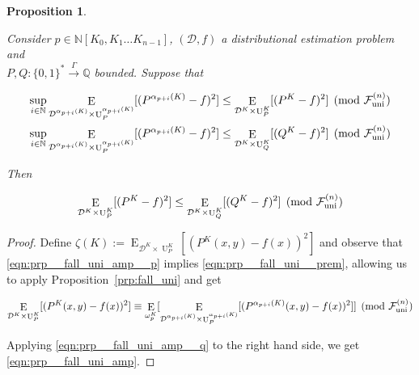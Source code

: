 \documentclass[11pt]{article}
\numberwithin{equation}{section}
\theoremstyle{definition}
\theoremstyle{plain}
\newtheorem{proposition}{Proposition}[section]
\newcommand{\Bool}{\{0,1\}}
\newcommand{\Words}{{\Bool^*}}
\DeclareMathOperator{\E}{E}
\DeclareMathOperator{\Un}{U}
\newcommand{\Nats}{\mathbb{N}}
\newcommand{\Rats}{\mathbb{Q}}
\newcommand{\NatPoly}{\Nats[K_0, K_1 \ldots K_{n-1}]}
\newcommand{\Dist}{\mathcal{D}}
\newcommand{\Fall}{\mathcal{F}}
\newcommand{\FallU}{{\Fall_{\textnormal{uni}}^{(n)}}}
\newcommand{\Scheme}{\xrightarrow{\Gamma}}
\begin{document}
\begin{samepage}
\begin{proposition}
\label{prp:fall_uni_amp}

Consider ${p \in \NatPoly}$, ${(\Dist,f)}$ a distributional estimation problem and\\ ${P,Q: \Words \Scheme \Rats}$ bounded. Suppose that

\begin{align}
\label{eqn:prp__fall_uni_amp__p}\sup_{i \in \Nats} \E_{ \Dist^{\alpha_{p+i}(K)} \times \Un_P^{\alpha_{p+i}(K)}}[(P^{\alpha_{p+i}(K)}-f)^2] &\leq \E_{ \Dist^{K} \times \Un_P^{K}}[(P^{K}-f)^2] \pmod\FallU \\
\label{eqn:prp__fall_uni_amp__q}\sup_{i \in \Nats} \E_{\Dist^{\alpha_{p+i}(K)} \times \Un_P^{\alpha_{p+i}(K)}}[(P^{\alpha_{p+i}(K)}-f)^2] &\leq \E_{\Dist^{K} \times \Un_Q^{K}}[(Q^{K}-f)^2] \pmod\FallU
\end{align}

Then

\begin{equation}
\label{eqn:prp__fall_uni_amp}
\E_{\Dist^{K} \times \Un_P^{K}}[(P^{K}-f)^2] \leq \E_{\Dist^{K} \times \Un_Q^{K}}[(Q^{K}-f)^2] \pmod \FallU
\end{equation}

\end{proposition}
\end{samepage}

\begin{proof}

Define ${\zeta(K):=\E_{\Dist^{K} \times \Un_P^{K}}[(P^{K}(x,y)-f(x))^2]}$ and observe that \ref{eqn:prp__fall_uni_amp__p} implies \ref{eqn:prp__fall_uni__prem}, allowing us to apply Proposition~\ref{prp:fall_uni} and get

\[\E_{\Dist^{K} \times \Un_P^{K}}[(P^{K}(x,y)-f(x))^2] \equiv \E_{\omega_p^K}[\E_{ \Dist^{\alpha_{p+i}(K)} \times \Un_P^{\alpha_{p+i}(K)}}[(P^{\alpha_{p+i}(K)}(x,y)-f(x))^2]] \pmod \FallU\]

Applying \ref{eqn:prp__fall_uni_amp__q} to the right hand side, we get \ref{eqn:prp__fall_uni_amp}.
%
\end{proof}
\end{document}
